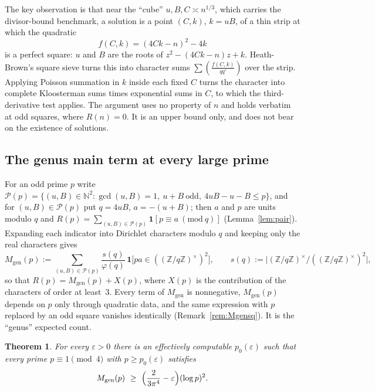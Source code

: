 \documentclass[11pt,reqno]{amsart}
\newtheorem{introthm}{Theorem}
\theoremstyle{definition}
\newcommand{\N}{\mathbb N}
\newcommand{\Z}{\mathbb Z}
\newcommand{\eps}{\varepsilon}
\newcommand{\leg}[2]{\left(\frac{#1}{#2}\right)}
\newcommand{\cP}{\mathcal P}
\newcommand{\Mgen}{M_{\mathrm{gen}}}
\begin{document}
The key observation is that near the ``cube'' $u,B,C\asymp n^{1/3}$, which
carries the divisor-bound benchmark, a solution is a point $(C,k)$,
$k=uB$, of a thin strip at which the quadratic
\[
 f(C,k)=(4Ck-n)^2-4k
\]
is a perfect square: $u$ and $B$ are the roots of $z^2-(4Ck-n)z+k$.
Heath-Brown's square sieve \cite{HB84} turns this into character sums
$\sum\leg{f(C,k)}{qq'}$ over the strip.  Applying Poisson summation in
$k$ inside each fixed $C$ turns the character into complete Kloosterman
sums times exponential sums in $C$, to which the third-derivative test
applies.  The argument uses no property of $n$ and holds verbatim at odd
squares, where $R(n)=0$.  It is an upper bound only, and does not bear on
the existence of solutions.

\subsection{The genus main term at every large prime}\label{subsec:genus-intro}
For an odd prime $p$ write
$\cP(p)=\{(u,B)\in\N^2:\gcd(u,B)=1,\ u+B\ \text{odd},\ 4uB-u-B\le p\}$, and
for $(u,B)\in\cP(p)$ put $q=4uB$, $a=-(u+B)$; then $a$ and $p$ are units
modulo $q$ and $R(p)=\sum_{(u,B)\in\cP(p)}\mathbf 1[p\equiv a\ (\mathrm{mod}\ q)]$
(Lemma~\ref{lem:pair}).  Expanding each indicator into Dirichlet
characters modulo $q$ and keeping only the real characters gives
\begin{equation}\label{eq:Mgen}
 \Mgen(p):=\sum_{(u,B)\in\cP(p)}\frac{s(q)}{\varphi(q)}\,
 \mathbf 1\bigl[pa\in((\Z/q\Z)^\times)^2\bigr],\qquad
 s(q):=\bigl|(\Z/q\Z)^\times/((\Z/q\Z)^\times)^2\bigr|,
\end{equation}
so that $R(p)=\Mgen(p)+X(p)$, where $X(p)$ is the contribution of the
characters of order at least~$3$.  Every term of $\Mgen$ is
nonnegative, $\Mgen(p)$ depends on $p$ only through quadratic data, and
the same expression with $p$ replaced by an odd square vanishes
identically (Remark~\ref{rem:Mgensq}).  It is the ``genus'' expected count.

\begin{introthm}\label{thm:B}
For every $\eps>0$ there is an effectively computable $p_0(\eps)$ such
that every prime $p\equiv1\pmod 4$ with $p\ge p_0(\eps)$ satisfies
\[
 \Mgen(p)\ \ge\ \Bigl(\frac{2}{3\pi^4}-\eps\Bigr)(\log p)^2 .
\]
\end{introthm}
\end{document}

